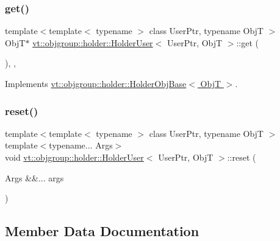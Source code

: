 \subsubsection{\texorpdfstring{get()}{get()}}
{\footnotesize\ttfamily template$<$template$<$ typename $>$ class User\+Ptr, typename ObjT $>$ \\
ObjT$\ast$ \hyperlink{structvt_1_1objgroup_1_1holder_1_1_holder_user}{vt\+::objgroup\+::holder\+::\+Holder\+User}$<$ User\+Ptr, ObjT $>$\+::get (\begin{DoxyParamCaption}{ }\end{DoxyParamCaption})\hspace{0.3cm}{\ttfamily [inline]}, {\ttfamily [override]}, {\ttfamily [virtual]}}



Implements \hyperlink{structvt_1_1objgroup_1_1holder_1_1_holder_obj_base_a4b350b0126259d31a62fd426a08f6698}{vt\+::objgroup\+::holder\+::\+Holder\+Obj\+Base$<$ Obj\+T $>$}.

\mbox{\label{structvt_1_1objgroup_1_1holder_1_1_holder_user_a4a43e5b38a0474cd523ccd9aa66950e9}} 
\subsubsection{\texorpdfstring{reset()}{reset()}}
{\footnotesize\ttfamily template$<$template$<$ typename $>$ class User\+Ptr, typename ObjT $>$ \\
template$<$typename... Args$>$ \\
void \hyperlink{structvt_1_1objgroup_1_1holder_1_1_holder_user}{vt\+::objgroup\+::holder\+::\+Holder\+User}$<$ User\+Ptr, ObjT $>$\+::reset (\begin{DoxyParamCaption}\item[{Args \&\&...}]{args }\end{DoxyParamCaption})\hspace{0.3cm}{\ttfamily [inline]}}



\subsection{Member Data Documentation}
\mbox{\label{structvt_1_1objgroup_1_1holder_1_1_holder_user_a7e5ba27e81a9cb9aa4bfe4eb3ee04e5c}} 
